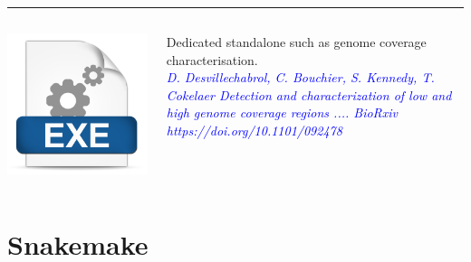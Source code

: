 \documentclass{beamer}
\begin{document}
\begin{frame}
  \rule{\textwidth}{1pt} 
  
  \begin{columns}
    \begin{column}{1.5cm}
      \includegraphics[height=0.2\textheight]{images/exe.png}
    \end{column}
    \begin{column}{9cm}
      Dedicated standalone such as genome coverage characterisation.\\
      {\footnotesize \textcolor{blue}{\textit{D. Desvillechabrol, C. 
      Bouchier, S. Kennedy, T. Cokelaer Detection and characterization of low 
      and high genome coverage regions .... BioRxiv 
      https://doi.org/10.1101/092478 }}}
    \end{column}
  \end{columns}
\end{frame}

\section{Snakemake}
\end{document}
